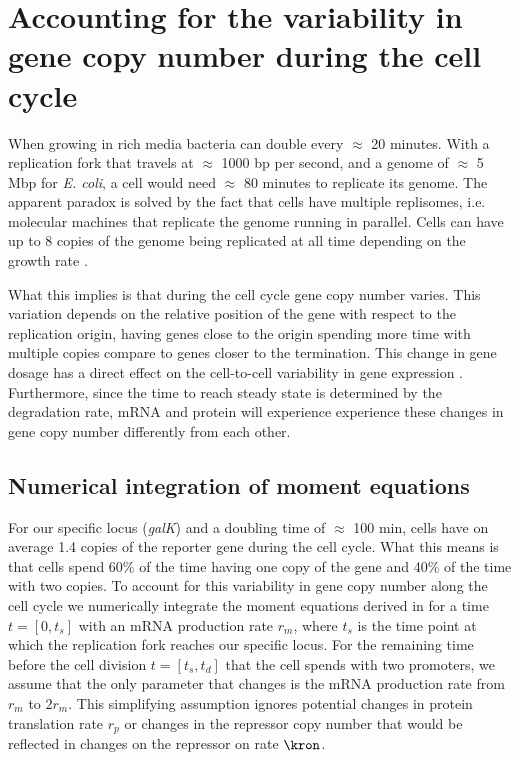 \label{sec_multi_gene}
\section{Accounting for the variability in gene copy number during the cell
cycle}

When growing in rich media bacteria can double every $\approx$ 20 minutes. With
a replication fork that travels at $\approx$ 1000 bp per second, and a genome of
$\approx$ 5 Mbp for {\it E. coli}\cite{Moran2010}, a cell would need $\approx$
80 minutes to replicate its genome. The apparent paradox is solved by the fact
that cells have multiple replisomes, i.e. molecular machines that replicate the
genome running in parallel. Cells can have up to 8 copies of the genome being
replicated at all time depending on the growth rate \cite{Bremer1996}.

What this implies is that during the cell cycle gene copy number varies. This
variation depends on the relative position of the gene with respect to the
replication origin, having genes close to the origin spending more time with
multiple copies compare to genes closer to the termination. This change in gene
dosage has a direct effect on the cell-to-cell variability in gene expression
\cite{Jones2014a, Peterson2015}. Furthermore, since the time to reach steady
state is determined by the degradation rate, mRNA and protein will experience
experience these changes in gene copy number differently from each other.

\subsection{Numerical integration of moment equations}

For our specific locus ({\it galK}) and a doubling time of $\approx$ 100 min,
cells have on average 1.4 copies of the reporter gene during the cell cycle.
What this means is that cells spend 60\% of the time having one copy of the gene
and 40\% of the time with two copies. To account for this variability in gene
copy number along the cell cycle we numerically integrate the moment equations
derived in  for a time $t = [0, t_s]$
with an mRNA production rate $r_m$, where $t_s$ is the time point at which the
replication fork reaches our specific locus. For the remaining time before the
cell division $t = [t_s, t_d]$ that the cell spends with two promoters, we
assume that the only parameter that changes is the mRNA production rate from
$r_m$ to $2 r_m$. This simplifying assumption ignores potential changes in
protein translation rate $r_p$ or changes in the repressor copy number that
would be reflected in changes on the repressor on rate $\kron$.

